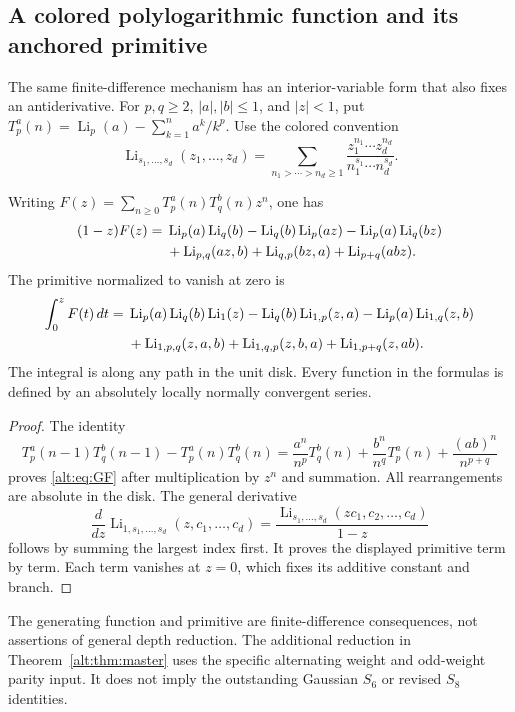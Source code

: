 \subsection{A colored polylogarithmic function and its anchored primitive}

The same finite-difference mechanism has an interior-variable form that
also fixes an antiderivative. For $p,q\ge2$, $|a|,|b|\le1$, and
$|z|<1$, put
$T_p^a(n)=\operatorname{Li}_p(a)-\sum_{k=1}^n a^k/k^p$.
Use the colored convention
\[
 \operatorname{Li}_{s_1,\ldots,s_d}(z_1,\ldots,z_d)
 =\sum_{n_1>\cdots>n_d\ge1}
       \frac{z_1^{n_1}\cdots z_d^{n_d}}
            {n_1^{s_1}\cdots n_d^{s_d}}.
\]

\begin{proposition}
\label{alt:prop:GF}
Writing $F(z)=\sum_{n\ge0}T_p^a(n)T_q^b(n)z^n$, one has
\begin{align}
 (1-z)F(z)={}&\operatorname{Li}_p(a)\operatorname{Li}_q(b)
 -\operatorname{Li}_q(b)\operatorname{Li}_p(az)
 -\operatorname{Li}_p(a)\operatorname{Li}_q(bz)\notag\\
 &+\operatorname{Li}_{p,q}(az,b)
  +\operatorname{Li}_{q,p}(bz,a)
  +\operatorname{Li}_{p+q}(abz).
 \label{alt:eq:GF}
\end{align}
The primitive normalized to vanish at zero is
\begin{align}
 \int_0^zF(t)\,dt={}&
  \operatorname{Li}_p(a)\operatorname{Li}_q(b)\operatorname{Li}_1(z)
 -\operatorname{Li}_q(b)\operatorname{Li}_{1,p}(z,a)
 -\operatorname{Li}_p(a)\operatorname{Li}_{1,q}(z,b)\notag\\
 &+\operatorname{Li}_{1,p,q}(z,a,b)
  +\operatorname{Li}_{1,q,p}(z,b,a)
  +\operatorname{Li}_{1,p+q}(z,ab).
 \label{alt:eq:primitive}
\end{align}
The integral is along any path in the unit disk. Every function in the
formulas is defined by an absolutely locally normally convergent series.
\end{proposition}
\begin{proof}
The identity
\[
 T_p^a(n-1)T_q^b(n-1)-T_p^a(n)T_q^b(n)
 =\frac{a^n}{n^p}T_q^b(n)+\frac{b^n}{n^q}T_p^a(n)
   +\frac{(ab)^n}{n^{p+q}}
\]
proves \eqref{alt:eq:GF} after multiplication by $z^n$ and summation.
All rearrangements are absolute in the disk. The general derivative
\[
 \frac{d}{dz}\operatorname{Li}_{1,s_1,\ldots,s_d}
                (z,c_1,\ldots,c_d)
 =\frac{\operatorname{Li}_{s_1,\ldots,s_d}
                (zc_1,c_2,\ldots,c_d)}{1-z}
\]
follows by summing the largest index first. It proves the displayed
primitive term by term. Each term vanishes at $z=0$, which fixes its
additive constant and branch.
\end{proof}
The generating function and primitive are finite-difference consequences,
not assertions of general depth reduction. The additional reduction in
Theorem~\ref{alt:thm:master} uses the specific alternating weight and
odd-weight parity input. It does not imply the outstanding Gaussian
$S_6$ or revised $S_8$ identities.
